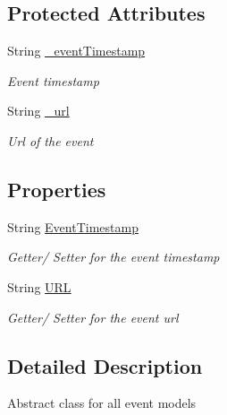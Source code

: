 \subsection*{Protected Attributes}
\begin{DoxyCompactItemize}
\item 
String \hyperlink{class_web_analyzer_1_1_models_1_1_event_model_1_1_base_event_model_ab4e25a53d20e317344a9df113ec2aab7}{\+\_\+event\+Timestamp}
\begin{DoxyCompactList}\small\item\em Event timestamp \end{DoxyCompactList}\item 
String \hyperlink{class_web_analyzer_1_1_models_1_1_event_model_1_1_base_event_model_a8cfc8644deaf4edfec7fcd7f08dfa20c}{\+\_\+url}
\begin{DoxyCompactList}\small\item\em Url of the event \end{DoxyCompactList}\end{DoxyCompactItemize}
\subsection*{Properties}
\begin{DoxyCompactItemize}
\item 
String \hyperlink{class_web_analyzer_1_1_models_1_1_event_model_1_1_base_event_model_ae6d980edbc758b7c413181778d79af3b}{Event\+Timestamp}
\begin{DoxyCompactList}\small\item\em Getter/ Setter for the event timestamp \end{DoxyCompactList}\item 
String \hyperlink{class_web_analyzer_1_1_models_1_1_event_model_1_1_base_event_model_a328a729d379e64c2007b70e828c95adb}{U\+R\+L}
\begin{DoxyCompactList}\small\item\em Getter/ Setter for the event url \end{DoxyCompactList}\end{DoxyCompactItemize}


\subsection{Detailed Description}
Abstract class for all event models 



